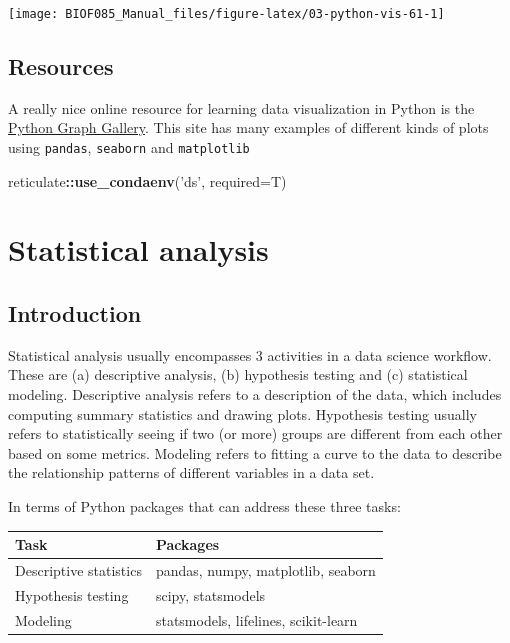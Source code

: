 \documentclass[
  letterpaper,
]{scrbook}
\newenvironment{Shaded}{\begin{snugshade}}{\end{snugshade}}
\newcommand{\DataTypeTok}[1]{\textcolor[rgb]{0.13,0.29,0.53}{#1}}
\newcommand{\KeywordTok}[1]{\textcolor[rgb]{0.13,0.29,0.53}{\textbf{#1}}}
\newcommand{\NormalTok}[1]{#1}
\newcommand{\OperatorTok}[1]{\textcolor[rgb]{0.81,0.36,0.00}{\textbf{#1}}}
\newcommand{\StringTok}[1]{\textcolor[rgb]{0.31,0.60,0.02}{#1}}
\begin{document}
\begin{center}\texttt{[image: BIOF085\_Manual\_files/figure-latex/03-python-vis-61-1]} \end{center}

\hypertarget{resources}{%
\section{Resources}\label{resources}}

A really nice online resource for learning data visualization in Python is the \href{https://python-graph-gallery.com/}{Python Graph Gallery}. This site has many examples of different kinds of plots using \texttt{pandas}, \texttt{seaborn} and \texttt{matplotlib}

\begin{Shaded}
\begin{Highlighting}[]
\NormalTok{reticulate}\OperatorTok{::}\KeywordTok{use_condaenv}\NormalTok{(}\StringTok{'ds'}\NormalTok{, }\DataTypeTok{required=}\NormalTok{T)}
\end{Highlighting}
\end{Shaded}

\hypertarget{statistical-analysis}{%
\chapter{Statistical analysis}\label{statistical-analysis}}

\hypertarget{introduction}{%
\section{Introduction}\label{introduction}}

Statistical analysis usually encompasses 3 activities in a data science workflow. These are (a) descriptive analysis, (b) hypothesis testing and (c) statistical modeling. Descriptive analysis refers to a description of the data, which includes computing summary statistics and drawing plots. Hypothesis testing usually refers to statistically seeing if two (or more) groups are different from each other based on some metrics. Modeling refers to fitting a curve to the data to describe the relationship patterns of different variables in a data set.

In terms of Python packages that can address these three tasks:

\begin{longtable}[]{@{}ll@{}}
\toprule
Task & Packages\tabularnewline
\midrule
\endhead
Descriptive statistics & pandas, numpy, matplotlib, seaborn\tabularnewline
Hypothesis testing & scipy, statsmodels\tabularnewline
Modeling & statsmodels, lifelines, scikit-learn\tabularnewline
\bottomrule
\end{longtable}
\end{document}
